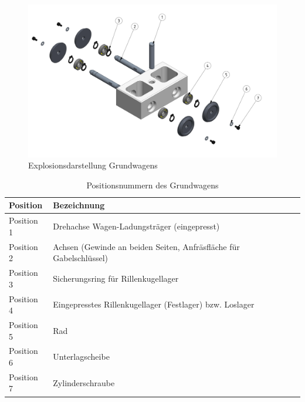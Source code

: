 \documentclass[../../main.tex]{subfiles}
\begin{document}
     \begin{figure}[H] %
        \centering
        \includegraphics[width=1\textwidth]{Fuehrungswagen.png}
        \caption{Explosionsdarstellung Grundwagens}
        \label{fig:expl_fuehrungswagen}
    \end{figure}

    \begin{table}[H] \centering
        \begin{tabular}{|l|l|}
        \hline
        \textbf{Position} & \textbf{Bezeichnung}\\
        \hline
        Position 1          & Drehachse Wagen-Ladungsträger (eingepresst)\\
         \hline
        Position 2          & Achsen (Gewinde an beiden Seiten, Anfräsfläche für Gabelschlüssel)\\
         \hline
        Position 3          & Sicherungsring für Rillenkugellager\\
        \hline
        Position 4          & Eingepresstes Rillenkugellager (Festlager) bzw. Loslager\\
        \hline
        Position 5          & Rad\\
        \hline
        Position 6          & Unterlagscheibe\\
        \hline
        Position 7          & Zylinderschraube\\
        \hline
        \end{tabular}

        \caption{Positionsnummern des Grundwagens}
        \label{tab:expl_fuehrungswagen}
        \end{table}
    \newpage
\end{document}
